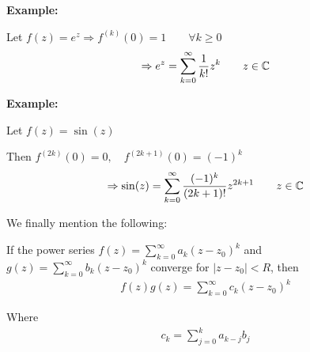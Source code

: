 \noindent\textbf{Example:}\par
\noindent Let $f(z) = e^z\Rightarrow f^{(k)}(0) = 1\qquad\forall k\geq0$
\begin{equation*}
  \begin{gathered}
    \Rightarrow e^z = \sum_{k=0}^{\infty}\dfrac{1}{k!}z^k\qquad z\in\mathbb{C}
  \end{gathered}
\end{equation*}
\par\bigskip
\noindent\textbf{Example:}\par
\noindent Let $f(z) = \sin(z)$\par
\noindent Then $f^{(2k)}(0) = 0,\quad f^{(2k+1)}(0) = (-1)^k$
\begin{equation*}
  \begin{gathered}
    \Rightarrow \sin(z) = \sum_{k=0}^{\infty}\dfrac{(-1)^k}{(2k+1)!}z^{2k+1}\qquad z\in\mathbb{C}
  \end{gathered}
\end{equation*}
\par\bigskip
\noindent We finally mention the following:
\par\bigskip
\begin{theo}[]{}
  If the power series $f(z) = \sum_{k=0}^{\infty}a_k(z-z_0)^k$ and $g(z) = \sum_{k=0}^{\infty}b_k(z-z_0)^k$ converge for $\left|z-z_0\right|<R$, then
  \begin{equation*}
    \begin{gathered}
      f(z)g(z) = \sum_{k=0}^{\infty}c_k(z-z_0)^k
    \end{gathered}
  \end{equation*}\par
  \noindent Where
  \begin{equation*}
    \begin{gathered}
      c_k = \sum_{j=0}^{k}a_{k-j}b_j
    \end{gathered}
  \end{equation*}
\end{theo}
\par\bigskip
